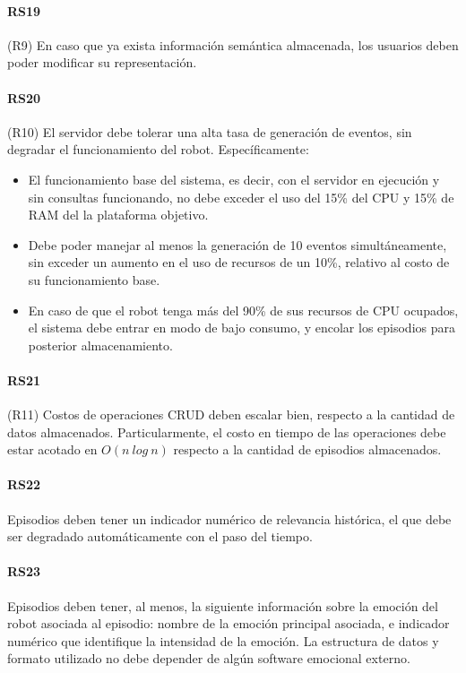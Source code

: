 \paragraph{RS19}
(R9) En caso que ya exista información semántica almacenada, los usuarios deben poder modificar su representación.

\paragraph{RS20}
(R10) El servidor debe tolerar una alta tasa de generación de eventos, sin degradar el funcionamiento del robot. Específicamente:
\begin{itemize}
	\item El funcionamiento base del sistema, es decir, con el servidor en ejecución y sin consultas funcionando, no debe exceder el uso del 15\% del CPU y 15\% de RAM del la plataforma objetivo.
	\item Debe poder manejar al menos la generación de 10 eventos simultáneamente, sin exceder un aumento en el uso de recursos de un 10\%, relativo al costo de su funcionamiento base.
	\item En caso de que el robot tenga más del 90\% de sus recursos de CPU ocupados, el sistema debe entrar en modo de bajo consumo, y encolar los episodios para posterior almacenamiento.
\end{itemize}


\paragraph{RS21}
(R11) Costos de operaciones CRUD deben escalar bien, respecto a la cantidad de datos almacenados. Particularmente, el costo en tiempo de las operaciones debe estar acotado en $O(n\ log\ n)$ respecto a la cantidad de episodios almacenados.

\paragraph{RS22}
Episodios deben tener un indicador numérico de relevancia histórica, el que debe ser degradado automáticamente con el paso del tiempo.

\paragraph{RS23}
Episodios deben tener, al menos, la siguiente información sobre la emoción del robot asociada al episodio: nombre de la emoción principal asociada, e indicador numérico que identifique la intensidad de la emoción. La estructura de datos y formato utilizado no debe depender de algún software emocional externo.

